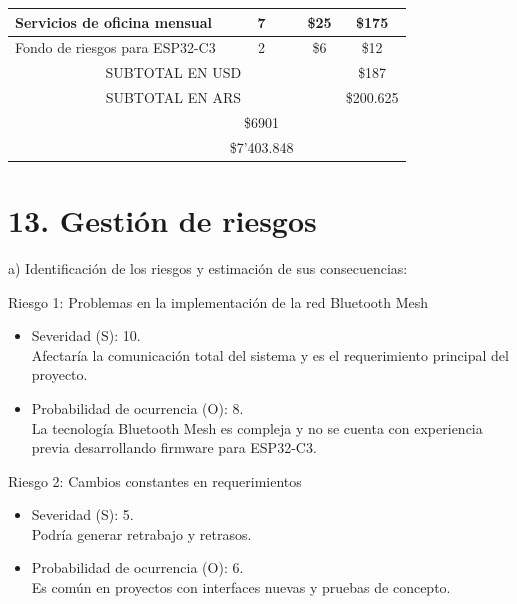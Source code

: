 \documentclass[
11pt, %
]{charter}
\begin{document}
\begin{table}[htpb]
\begin{tabularx}{\linewidth}{@{}|X|c|r|r|@{}}
  \multicolumn{1}{|l|}{Servicios de oficina mensual} & 
  \multicolumn{1}{c|}{7} &
  \multicolumn{1}{c|}{\$25} &
  \multicolumn{1}{c|}{\$175} \\ \hline
  
  \multicolumn{1}{|l|}{Fondo de riesgos para ESP32-C3} & 
  \multicolumn{1}{c|}{2} &
  \multicolumn{1}{c|}{\$6} &
  \multicolumn{1}{c|}{\$12} \\ \hline
    
  \multicolumn{3}{|c|}{SUBTOTAL EN USD} &
  \multicolumn{1}{c|}{\$187} \\ \hline
  
  \multicolumn{3}{|c|}{SUBTOTAL EN ARS} &
  \multicolumn{1}{c|}{\$200.625} \\ \hline
  
\rowcolor[HTML]{C0C0C0}
\multicolumn{3}{|c|}{TOTAL EN USD} &
\multicolumn{1}{c|}{\$6901} \\ \hline
  
\rowcolor[HTML]{C0C0C0}
\multicolumn{3}{|c|}{TOTAL EN ARS} &
\multicolumn{1}{c|}{\$7'403.848} \\ \hline

\end{tabularx}%
\end{table}




\section{13. Gestión de riesgos}
\label{sec:riesgos}

a) Identificación de los riesgos y estimación de sus consecuencias:

Riesgo 1: Problemas en la implementación de la red Bluetooth Mesh
\begin{itemize}
	\item Severidad (S): 10. \\
	Afectaría la comunicación total del sistema y es el requerimiento principal del proyecto.	
	\item Probabilidad de ocurrencia (O): 8. \\
	La tecnología Bluetooth Mesh es compleja y no se cuenta con experiencia previa desarrollando firmware para ESP32-C3. 
\end{itemize}   

Riesgo 2: Cambios constantes en requerimientos
\begin{itemize}
	\item Severidad (S): 5. \\
	Podría generar retrabajo y retrasos.	
	\item Probabilidad de ocurrencia (O): 6. \\
	Es común en proyectos con interfaces nuevas y pruebas de concepto.
\end{itemize}   
\end{document}
